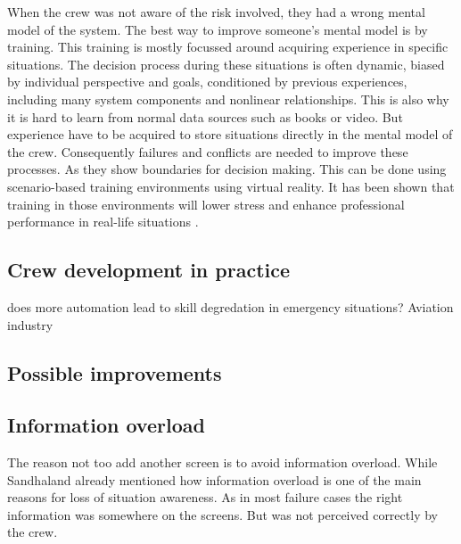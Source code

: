 When the crew was not aware of the risk involved, they had a wrong mental model of the system. The best way to improve someone's mental model is by training. This training is mostly focussed around acquiring experience in specific situations. The decision process during these situations is often dynamic, biased by individual perspective and goals, conditioned by previous experiences, including many system components and nonlinear relationships. This is also why it is hard to learn from normal data sources such as books or video. But experience have to be acquired to store situations directly in the mental model of the crew. Consequently failures and conflicts are needed to improve these processes. As they show boundaries for decision making. This can be done using scenario-based training environments using virtual reality. It has been shown that training in those environments will lower stress and enhance professional performance in real-life situations \cite{Ford1998} \cite{Cohen2016}.

\subsection{Crew development in practice}




does more automation lead to skill degredation in emergency situations? Aviation industry


\subsection{Possible improvements}

\subsection{Information overload}
The reason not too add another screen is to avoid information overload. While Sandhaland already mentioned how information overload is one of the main reasons for loss of situation awareness. As in most failure cases the right information was somewhere on the screens. But was not perceived correctly by the crew.


